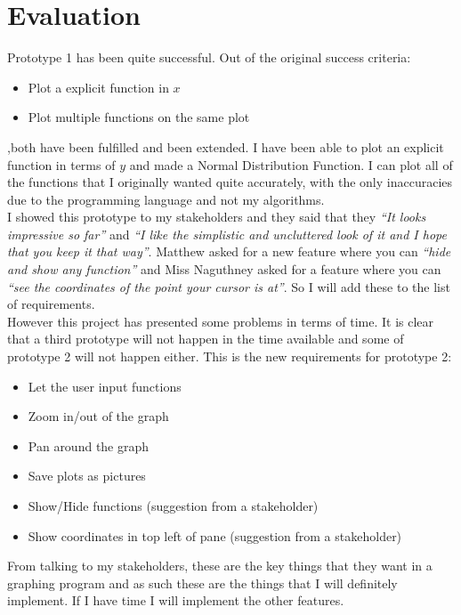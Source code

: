 \documentclass[../../../main.tex]{subfiles}
\begin{document}
\chapter{Evaluation}
Prototype 1 has been quite successful. Out of the original success criteria:
\begin{itemize}
	\item Plot a explicit function in $x$
	\item Plot multiple functions on the same plot
\end{itemize}
,both have been fulfilled and been extended. I have been able to plot an explicit function in terms of $y$ and made a Normal Distribution Function. I can plot all of the functions that I originally wanted quite accurately, with the only inaccuracies due to the programming language and not my algorithms.\\
I showed this prototype to my stakeholders and they said that they \textit{``It looks impressive so far''} and \textit{``I like the simplistic and uncluttered look of it and I hope that you keep it that way''}. Matthew asked for a new feature where you can \textit{``hide and show any function''} and Miss Naguthney asked for a feature where you can \textit{``see the coordinates of the point your cursor is at''}. So I will add these to the list of requirements.
\\
However this project has presented some problems in terms of time. It is clear that a third prototype will not happen in the time available and some of prototype 2 will not happen either. This is the new requirements for prototype 2:
\begin{itemize}
	\item Let the user input functions
	\item Zoom in/out of the graph
	\item Pan around the graph
	\item Save plots as pictures
	\item Show/Hide functions (suggestion from a stakeholder)
	\item Show coordinates in top left of pane (suggestion from a stakeholder)
\end{itemize}
From talking to my stakeholders, these are the key things that they want in a graphing program and as such these are the things that I will definitely implement. If I have time I will implement the other features.
\newpage
\end{document}
